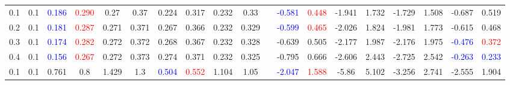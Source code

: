 \documentclass[specialist,
substylefile = spbu_report.rtx,
subf,href,colorlinks=true, 12pt]{disser}
\theoremstyle{definition}
\begin{document}
\begin{table}
{\begin{tabular}{m{1cm}m{1cm}ccccccccm{0.2cm}cccccccc}
			0.1 & 0.1    & \textcolor{blue}{0.186}                      & \textcolor{red}{0.290}                     & 0.27                                          & 0.37                        & 0.224                   & 0.317                                   & 0.232                                      & 0.33                     &                             & \textcolor{blue}{-0.581} & \textcolor{red}{0.448} & -1.941                   & 1.732                  & -1.729   & 1.508                   & -0.687                   & 0.519                   \\
			0.2 & 0.1    & \textcolor{blue}{0.181}                      & \textcolor{red}{0.287}                     & 0.271                                         & 0.371                       & 0.267                   & 0.366                                   & 0.232                                      & 0.329                    &                             & \textcolor{blue}{-0.599} & \textcolor{red}{0.465} & -2.026                   & 1.824                  & -1.981   & 1.773                   & -0.615                   & 0.468                   \\
			0.3 & 0.1    & \textcolor{blue}{0.174}                      & \textcolor{red}{0.282}                     & 0.272                                         & 0.372                       & 0.268                   & 0.367                                   & 0.232                                      & 0.328                    &                             & -0.639                   & 0.505                  & -2.177                   & 1.987                  & -2.176   & 1.975                   & \textcolor{blue}{-0.476} & \textcolor{red}{0.372}  \\
			0.4 & 0.1    & \textcolor{blue}{0.156}                      & \textcolor{red}{0.267}                     & 0.272                                         & 0.373                       & 0.274                   & 0.371                                   & 0.232                                      & 0.325                    &                             & -0.795                   & 0.666                  & -2.606                   & 2.443                  & -2.725   & 2.542                   & \textcolor{blue}{-0.263} & \textcolor{blue}{0.233} \\
			\hline
			0.1 & 0.1    & 0.761                                        & 0.8                                        & 1.429                                         & 1.3                         & \textcolor{blue}{0.504} & \textcolor{red}{0.552}                  & 1.104                                      & 1.05                     &                             & \textcolor{blue}{-2.047} & \textcolor{red}{1.588} & -5.86                    & 5.102                  & -3.256   & 2.741                   & -2.555                   & 1.904                   \\

\end{tabular}}
\end{table}
\end{document}
